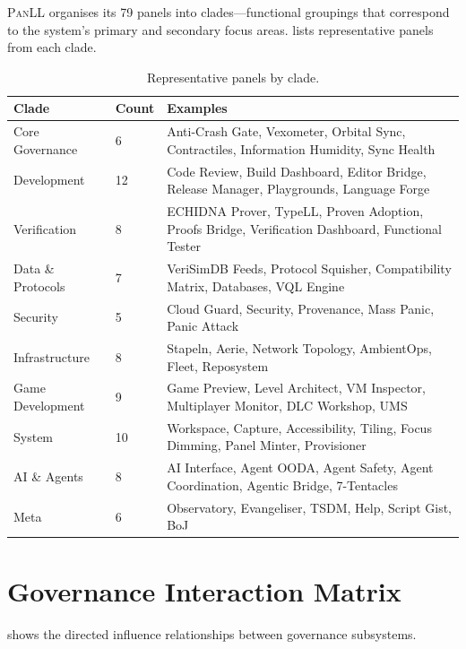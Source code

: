 \documentclass[11pt,a4paper]{article}
\newcommand{\panll}{\textsc{PanLL}}
\begin{document}
\panll{} organises its 79 panels into clades---functional groupings
that correspond to the system's primary and secondary focus areas.
 lists representative panels from each clade.

\begin{table}[h]
\centering
\caption{Representative panels by clade.}\label{tab:clades}
\small
\begin{tabular}{@{}llp{6cm}@{}}
\toprule
\textbf{Clade} & \textbf{Count} & \textbf{Examples} \\
\midrule
Core Governance & 6 & Anti-Crash Gate, Vexometer, Orbital Sync,
  Contractiles, Information Humidity, Sync Health \\
Development & 12 & Code Review, Build Dashboard, Editor Bridge,
  Release Manager, Playgrounds, Language Forge \\
Verification & 8 & ECHIDNA Prover, TypeLL, Proven Adoption,
  Proofs Bridge, Verification Dashboard,
  Functional Tester \\
Data \& Protocols & 7 & VeriSimDB Feeds, Protocol Squisher,
  Compatibility Matrix, Databases, VQL Engine \\
Security & 5 & Cloud Guard, Security, Provenance,
  Mass Panic, Panic Attack \\
Infrastructure & 8 & Stapeln, Aerie, Network Topology,
  AmbientOps, Fleet, Reposystem \\
Game Development & 9 & Game Preview, Level Architect, VM Inspector,
  Multiplayer Monitor, DLC Workshop, UMS \\
System & 10 & Workspace, Capture, Accessibility, Tiling,
  Focus Dimming, Panel Minter, Provisioner \\
AI \& Agents & 8 & AI Interface, Agent OODA, Agent Safety,
  Agent Coordination, Agentic Bridge, 7-Tentacles \\
Meta & 6 & Observatory, Evangeliser, TSDM, Help,
  Script Gist, BoJ \\
\bottomrule
\end{tabular}
\end{table}

\section{Governance Interaction Matrix}\label{app:governance-matrix}

 shows the directed influence relationships
between governance subsystems.
\end{document}
